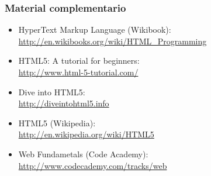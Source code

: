 \begin{frame}
\frametitle{Material complementario}

\begin{itemize}
\item HyperText Markup Language (Wikibook): \\
  \url{http://en.wikibooks.org/wiki/HTML_Programming}
\item HTML5: A tutorial for beginners: \\
  \url{http://www.html-5-tutorial.com/}
\item Dive into HTML5: \\
  \url{http://diveintohtml5.info}
\item HTML5 (Wikipedia): \\
  \url{http://en.wikipedia.org/wiki/HTML5}
\item Web Fundametals (Code Academy): \\
  \url{http://www.codecademy.com/tracks/web}
\end{itemize}


\end{frame}

